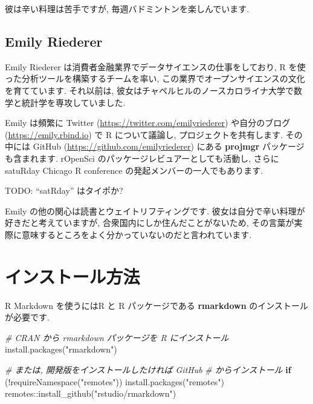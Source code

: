 \documentclass[
  11pt,
]{bxjsreport}
\newenvironment{Shaded}{\begin{snugshade}}{\end{snugshade}}
\newcommand{\CommentTok}[1]{\textcolor[rgb]{0.56,0.35,0.01}{\textit{#1}}}
\newcommand{\ControlFlowTok}[1]{\textcolor[rgb]{0.13,0.29,0.53}{\textbf{#1}}}
\newcommand{\FunctionTok}[1]{\textcolor[rgb]{0.00,0.00,0.00}{#1}}
\newcommand{\NormalTok}[1]{#1}
\newcommand{\SpecialCharTok}[1]{\textcolor[rgb]{0.00,0.00,0.00}{#1}}
\newcommand{\StringTok}[1]{\textcolor[rgb]{0.31,0.60,0.02}{#1}}
\begin{document}
彼は辛い料理は苦手ですが, 毎週バドミントンを楽しんでいます.

\hypertarget{emily-riederer}{%
\section*{Emily Riederer}\label{emily-riederer}}

Emily Riederer は消費者金融業界でデータサイエンスの仕事をしており, R を使った分析ツールを構築するチームを率い, この業界でオープンサイエンスの文化を育てています. それ以前は, 彼女はチャペルヒルのノースカロライナ大学で数学と統計学を専攻していました.

Emily は頻繁に Twitter (\url{https://twitter.com/emilyriederer}) や自分のブログ (\url{https://emily.rbind.io}) で R について議論し, プロジェクトを共有します. その中には GitHub (\url{https://github.com/emilyriederer}) にある \textbf{projmgr} パッケージも含まれます. rOpenSci のパッケージレビュアーとしても活動し, さらに satuRday Chicago R conference の発起メンバーの一人でもあります.

TODO: ``satRday'' はタイポか?

Emily の他の関心は読書とウェイトリフティングです. 彼女は自分で辛い料理が好きだと考えていますが, 合衆国内にしか住んだことがないため, その言葉が実際に意味するところをよく分かっていないのだと言われています.

\mainmatter

\hypertarget{installation}{%
\chapter{インストール方法}\label{installation}}

R Markdown を使うにはR \autocite{R-base} と R パッケージである \textbf{rmarkdown} \autocite{R-rmarkdown} のインストールが必要です.

\begin{Shaded}
\begin{Highlighting}[numbers=left,,]
\CommentTok{\# CRAN から rmarkdown パッケージを R にインストール}
\FunctionTok{install.packages}\NormalTok{(}\StringTok{"rmarkdown"}\NormalTok{)}

\CommentTok{\# または, 開発版をインストールしたければ GitHub}
\CommentTok{\# からインストール}
\ControlFlowTok{if}\NormalTok{ (}\SpecialCharTok{!}\FunctionTok{requireNamespace}\NormalTok{(}\StringTok{"remotes"}\NormalTok{)) }\FunctionTok{install.packages}\NormalTok{(}\StringTok{"remotes"}\NormalTok{)}
\NormalTok{remotes}\SpecialCharTok{::}\FunctionTok{install\_github}\NormalTok{(}\StringTok{"rstudio/rmarkdown"}\NormalTok{)}
\end{Highlighting}
\end{Shaded}
\end{document}
